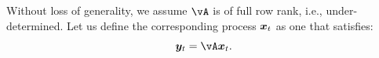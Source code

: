 \documentclass[../../book-main.tex]{subfiles}
\begin{document}


Without loss of generality, we assume $\vA$ is of full row rank, i.e., under-determined. Let us define the corresponding process $\bm{x}_t$ as one that satisfies:
\begin{equation}
\y_t = \vA \x_t.   
\end{equation}
\end{document}
